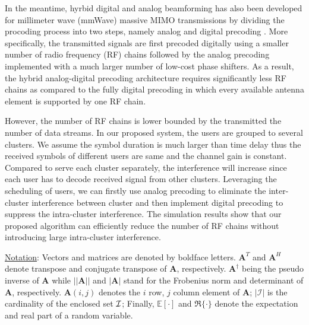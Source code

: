 \documentclass[conference]{IEEEtran}
\begin{document}
In the meantime, hyrbid digital and analog beamforming has also been developed for millimeter wave (mmWave) massive MIMO transmissions by dividing the procoding process into two steps, namely analog and digital precoding \cite{han2015large, el2014spatially}. More specifically, the transmitted signals are first precoded digitally using a smaller number of radio frequency (RF) chains followed by the analog precoding implemented with a much larger number of low-cost phase shifters. As a result, the hybrid analog-digital precoding architecture requires significantly less RF chains as compared to the fully digital precoding in which every available antenna element is supported by one RF chain. 


{\color{red}However, the number of RF chains is lower bounded by the transmitted the number of data streams. In our proposed system, the users are grouped to several clusters. We assume the symbol duration is much larger than time delay thus the received symbols of different users are same and the channel gain is constant. Compared to serve each cluster separately, the interference will increase since each user has to decode received signal from other clusters. Leveraging the scheduling of users, we can firstly use analog precoding to eliminate the inter-cluster interference between cluster and then implement digital precoding to suppress the intra-cluster interference. The simulation results show that our proposed algorithm can efficiently reduce the number of RF chains without introducing large intra-cluster interference.} 

\underline{Notation}: Vectors and matrices are denoted by boldface letters. ${\bm A}^T$ and ${\bm A}^H$ denote transpose and conjugate transpose of ${\bm A}$, respectively. $\bm{A}^\dagger$ being the pseudo inverse of $\bm{A}$ while $||\bm{A}|| $ and $|\bm{A}|$ stand for the Frobenius norm and determinant of ${\bm A}$, respectively. $\bm{A}(i,j)$ denotes the $i$ row, $j$ column element of ${\bm A}$; $|\mathcal{I}|$ is the cardinality of the enclosed set ${\cal I}$; Finally, $\mathbb{E}[\cdot] $ and $\Re\{\cdot\}$ denote the expectation and real part of a random variable.
\end{document}
